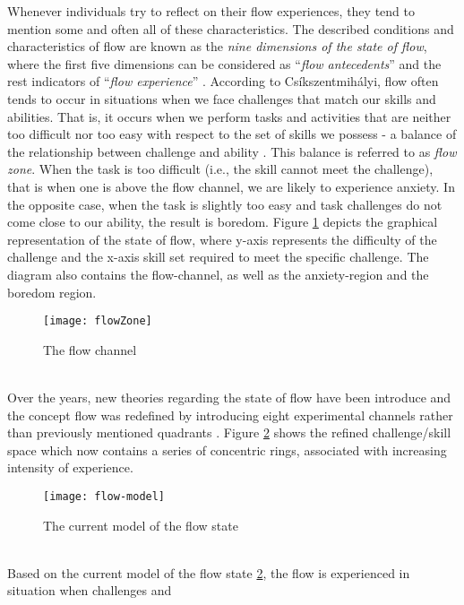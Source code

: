 Whenever individuals try to reflect on their flow experiences, they tend to mention some and often all of these characteristics. The described conditions and characteristics of flow are known as the \textit{nine dimensions of the state of flow}, where the first five dimensions can be considered as ``\textit{flow antecedents}'' and the rest indicators of ``\textit{flow experience}'' \cite{kiili2006evaluations}. According to Cs\'{i}kszentmih\'{a}lyi, flow often tends to occur in situations when we face challenges that match our skills and abilities. That is, it occurs when we perform tasks and activities that are neither too difficult nor too easy with respect to the set of skills we possess - a balance of the relationship between challenge and ability \cite{csikszentmihalyi1997finding, flow1990psychology, csikszentmihalyi1996flow}. This balance is referred to as \textit{flow zone}. When the task is too difficult (i.e., the skill cannot meet the challenge), that is when one is above the flow channel, we are likely to experience anxiety. In the opposite case, when the task is slightly too easy and task challenges do not come close to our ability, the result is boredom. Figure \ref{fig:flowZone} depicts the graphical representation of the state of flow, where y-axis represents the difficulty of the challenge and the x-axis skill set required to meet the specific challenge. The diagram also contains the flow-channel, as well as the anxiety-region and the boredom region.
\pagebreak
\begin{figure}[h]
    \centering
    \texttt{[image: flowZone]}
    \caption{The flow channel}
    \label{fig:flowZone}
\end{figure}\\
Over the years, new theories regarding the state of flow have been introduce and the concept flow was redefined by introducing eight experimental channels rather than previously mentioned quadrants \cite{nakamura2014concept}. Figure \ref{fig:flowModel} shows the refined challenge/skill space which now contains a series of concentric rings, associated with increasing intensity of experience.\\
\begin{figure}[h]
    \centering
    \texttt{[image: flow-model]}
    \caption{The current model of the flow state \cite{nakamura2014concept}}
    \label{fig:flowModel}
\end{figure}\\
Based on the current model of the flow state \ref{fig:flowModel}, the flow is experienced in situation when challenges and
